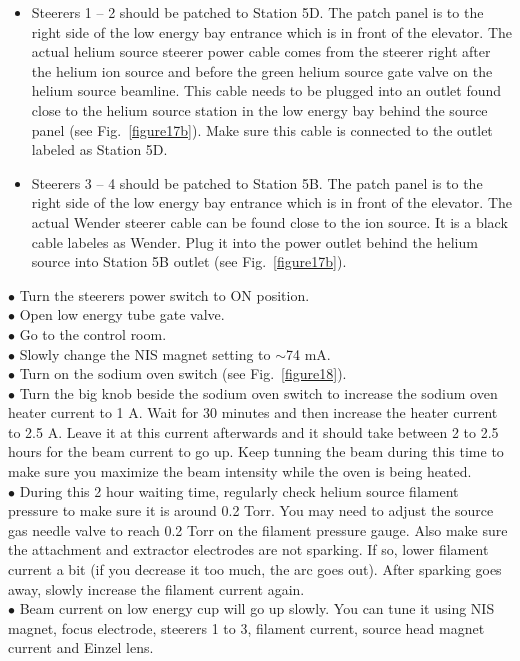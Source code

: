 \documentclass{article}
\begin{document}
\begin{itemize}
  \item Steerers 1 -- 2 should be patched to Station 5D. The patch panel is to the right side of the low energy bay entrance which is in front of the elevator. The actual helium source steerer power cable comes from the steerer right after the helium ion source and before the green helium source gate valve on the helium source beamline. This cable needs to be plugged into an outlet found close to the helium source station in the low energy bay behind the source panel (see Fig.~\ref{figure17b}). Make sure this cable is connected to the outlet labeled as Station 5D.
  \item Steerers 3 -- 4 should be patched to Station 5B. The patch panel is to the right side of the low energy bay entrance which is in front of the elevator. The actual Wender steerer cable can be found close to the ion source. It is a black cable labeles as Wender. Plug it into the power outlet behind the helium source into Station 5B outlet (see Fig.~\ref{figure17b}).
\end{itemize}
$\bullet$ Turn the steerers power switch to ON position.\\
$\bullet$ Open low energy tube gate valve.\\
$\bullet$ Go to the control room.\\
$\bullet$ Slowly change the NIS magnet setting to $\sim$74 mA.\\
$\bullet$ Turn on the sodium oven switch (see Fig.~\ref{figure18}).\\
$\bullet$ Turn the big knob beside the sodium oven switch to increase the sodium oven heater current to 1 A. Wait for 30 minutes and then increase the heater current to 2.5 A. Leave it at this current afterwards and it should take between 2 to 2.5 hours for the beam current to go up. Keep tunning the beam during this time to make sure you maximize the beam intensity while the oven is being heated.\\
$\bullet$ During this 2 hour waiting time, regularly check helium source filament pressure to make sure it is around 0.2 Torr. You may need to adjust the source gas needle valve to reach 0.2 Torr on the filament pressure gauge. Also make sure the attachment and extractor electrodes are not sparking. If so, lower filament current a bit (if you decrease it too much, the arc goes out). After sparking goes away, slowly increase the filament current again.\\
$\bullet$ Beam current on low energy cup will go up slowly. You can tune it using NIS magnet, focus electrode, steerers 1 to 3, filament current, source head magnet current and Einzel lens.\\
\end{document}

